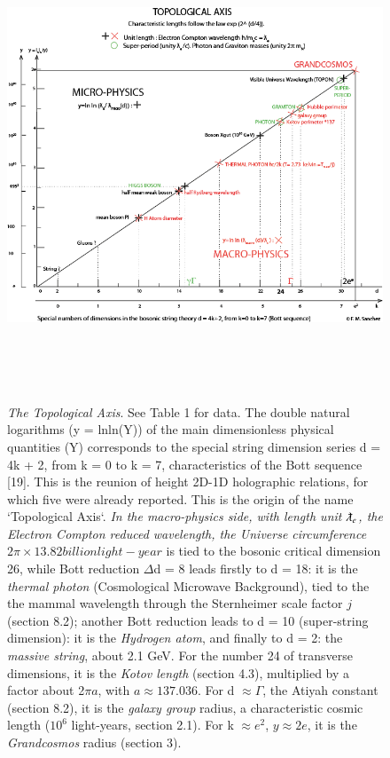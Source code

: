 \documentclass[twoside,draft]{article}
\begin{document}
\begin{sloppypar}
\begin{figure}
\centering
\includegraphics[width=\textwidth,height=14cm]{./figures/figure}
\caption{\textit{The Topological Axis}. See Table 1 for data. The double natural logarithms (y = lnln(Y)) of the main dimensionless physical quantities (Y) corresponds to the special string dimension series d = 4k + 2, from k = 0 to k = 7, characteristics of the Bott sequence [19]. This is the reunion of height 2D-1D holographic relations, for which five were already reported. This is the origin of the name `Topological Axis`. 
\textit{In the macro-physics side, with length unit $\lambdabar_e$, the Electron Compton reduced wavelength, the Universe circumference $2\pi \times 13.82 billion light-year$} is tied to the bosonic critical dimension 26, while Bott reduction $\Delta$d = 8 leads firstly to  d = 18: it is the \textit{thermal photon} (Cosmological Microwave Background), tied to the the mammal wavelength through the Sternheimer scale factor $j$ (section 8.2); another Bott reduction leads to d = 10 (super-string dimension): it is the \textit{Hydrogen atom}, and finally to d = 2: the \textit{massive string}, about 2.1 GeV. For the number 24 of transverse dimensions, it is the \textit{Kotov length} (section 4.3), multiplied by a factor about 2$\pi a$, with $a \approx 137.036$. For d $\approx \Gamma$, the Atiyah constant (section 8.2), it is the \textit{galaxy group} radius, a characteristic cosmic length ($10^{6}$ light-years, section 2.1). For k $\approx e^{2}$, $y \approx 2e$, it is the \textit{Grandcosmos} radius (section 3). 
}
\end{figure}
\end{sloppypar}
\end{document}
